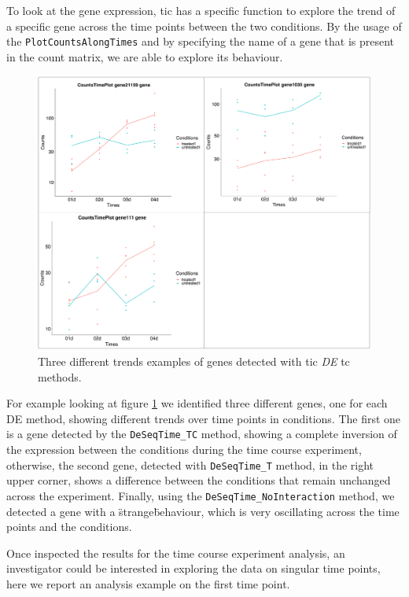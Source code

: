 To look at the gene expression, \gls{tic} has a specific function to explore the trend of a specific gene across the time points between the two conditions. 
By the usage of the \lstinline!PlotCountsAlongTimes! and by specifying the name of a gene that is present in the count matrix, we are able to explore its behaviour.

\begin{figure}[H]
\includegraphics[width=\textwidth,keepaspectratio]{img/ticorser/de/trends/trends.pdf}
\caption[ticorser genes trends]{Three different trends examples of genes detected with \gls{tic} \textit{DE} \gls{tc} methods.}
\label{fig:ticorsertrends}
\centering
\end{figure}

For example looking at figure \ref{fig:ticorsertrends} we identified three different genes, one for each DE method, showing different trends over time points in conditions.
The first one is a gene detected by the \lstinline!DeSeqTime_TC! method, showing a complete inversion of the expression between the conditions during the time course experiment, otherwise, the second gene, detected with \lstinline!DeSeqTime_T! method, in the right upper corner, shows a difference between the conditions that remain unchanged across the experiment.
Finally, using the \lstinline!DeSeqTime_NoInteraction! method, we detected a gene with a \"strange\" behaviour, which is very oscillating across the time points and the conditions. 

Once inspected the results for the time course experiment analysis, an investigator could be interested in exploring the data on singular time points, here we report an analysis example on the first time point.

